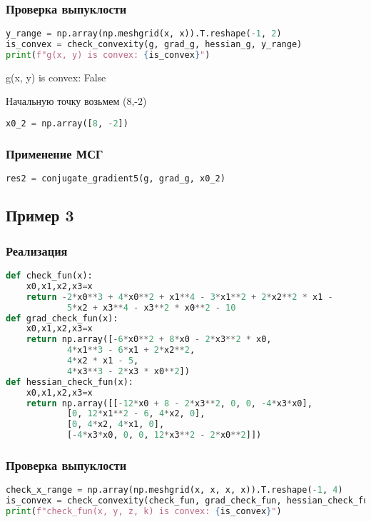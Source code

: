 \documentclass{article}
\begin{document}
\subsubsection{Проверка выпуклости}
\begin{lstlisting}[language=Python]
y_range = np.array(np.meshgrid(x, x)).T.reshape(-1, 2)
is_convex = check_convexity(g, grad_g, hessian_g, y_range)
print(f"g(x, y) is convex: {is_convex}")
\end{lstlisting}

g(x, y) is convex: False

Начальную точку возьмем (8,-2)

\begin{lstlisting}[language=Python]
x0_2 = np.array([8, -2])
\end{lstlisting}

\subsubsection{Применение МСГ}
\begin{lstlisting}[language=Python]
res2 = conjugate_gradient5(g, grad_g, x0_2)
\end{lstlisting}

\newpage
\subsection{Пример 3}

\subsubsection{Реализация}
\begin{lstlisting}[language=Python]
def check_fun(x):
    x0,x1,x2,x3=x
    return -2*x0**3 + 4*x0**2 + x1**4 - 3*x1**2 + 2*x2**2 * x1 - 
    		5*x2 + x3**4 - x3**2 * x0**2 - 10
def grad_check_fun(x):
    x0,x1,x2,x3=x
    return np.array([-6*x0**2 + 8*x0 - 2*x3**2 * x0,
            4*x1**3 - 6*x1 + 2*x2**2,
            4*x2 * x1 - 5,
            4*x3**3 - 2*x3 * x0**2])
def hessian_check_fun(x):
    x0,x1,x2,x3=x
    return np.array([[-12*x0 + 8 - 2*x3**2, 0, 0, -4*x3*x0],
            [0, 12*x1**2 - 6, 4*x2, 0],
            [0, 4*x2, 4*x1, 0],
            [-4*x3*x0, 0, 0, 12*x3**2 - 2*x0**2]])
\end{lstlisting}

\subsubsection{Проверка выпуклости}
\begin{lstlisting}[language=Python]
check_x_range = np.array(np.meshgrid(x, x, x, x)).T.reshape(-1, 4)
is_convex = check_convexity(check_fun, grad_check_fun, hessian_check_fun, check_x_range)
print(f"check_fun(x, y, z, k) is convex: {is_convex}")
\end{lstlisting}
\end{document}
